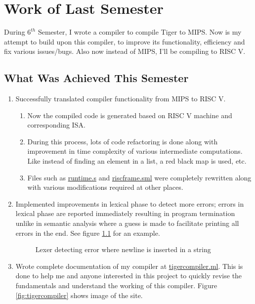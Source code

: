 \chapter{Work of Last Semester}

During $6^{th}$ Semester, I wrote a compiler to compile Tiger to MIPS. Now is my attempt to build upon this compiler, to improve its functionality, efficiency and fix various issues/bugs. Also now instead of MIPS, I'll be compiling to RISC V.

\section{What Was Achieved This Semester}

\begin{enumerate}
	\item Successfully translated compiler functionality from MIPS to RISC V.
	      \begin{enumerate}
		      \item Now the compiled code is generated based on RISC V machine and corresponding ISA.
		      \item During this process, lots of code refactoring is done along with improvement in time complexity of various intermediate computations. Like instead of finding an element in a list, a red black map is used, etc.
		      \item Files such as \href{https://github.com/sourabh2311/btp/blob/master/Compiler/runtime.s}{runtime.s} and \href{https://github.com/sourabh2311/btp/blob/master/Compiler/riscframe.sml}{riscframe.sml} were completely rewritten along with various modifications required at other places.
	      \end{enumerate}
	\item Implemented improvements in lexical phase to detect more errors; errors in lexical phase are reported immediately resulting in program termination unlike in semantic analysis where a guess is made to facilitate printing all errors in the end. See figure \ref{fig:lexError} for an example.
	      \begin{figure}
		      \centering
		      \caption{Lexer detecting error where newline is inserted in a string}
		      \label{fig:lexError}
	      \end{figure}
	\item Wrote complete documentation of my compiler at \href{https://tigercompiler.ml}{tigercompiler.ml}. This is done to help me and anyone interested in this project to quickly revise the fundamentals and understand the working of this compiler. Figure \ref{fig:tigercompiler} shows image of the site.

\end{enumerate}
